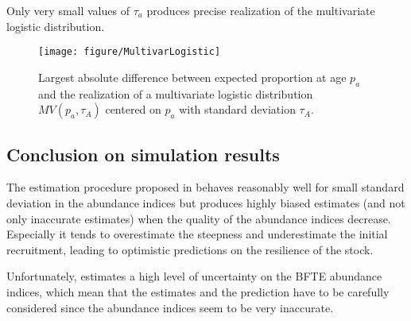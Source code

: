 Only very small values of $\tau_a$ produces precise realization of the multivariate logistic distribution. 
\begin{figure}
\texttt{[image: figure/MultivarLogistic]}
 \caption{Largest absolute difference between expected proportion at age $p_a$ and the realization of a multivariate logistic distribution $MV(p_a, \tau_A)$ centered on $p_a$ with  standard deviation $\tau_A$. }
 \label{fig:tau_A}
 \end{figure} 

 \subsection{Conclusion on simulation results}
The estimation procedure proposed in \iscam behaves reasonably well for small standard deviation in the abundance indices but produces highly biased estimates (and not only inaccurate estimates) when the quality of the abundance indices decrease. Especially it tends to overestimate the steepness and underestimate the  initial recruitment, leading to optimistic predictions on the resilience of the stock.

Unfortunately, \iscam estimates a high level of uncertainty on the BFTE abundance indices, which mean that the estimates and the prediction have to be carefully considered since the abundance indices seem to be very inaccurate. 




